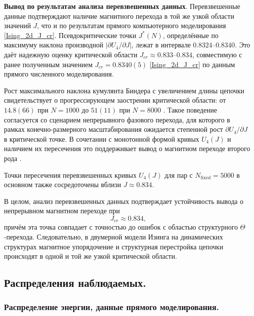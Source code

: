   
   \textbf{Вывод по результатам анализа перевзвешенных данных}. 
   Перевзвешенные данные подтверждают наличие магнитного перехода в той же узкой области значений $J$, что и по результатам прямого компьютерного моделирования \eqref{Ising_2d_J_cr}. 
   Псевдокритические точки $J^*(N)$, определённые по максимуму наклона производной  $|\partial U_4/\partial J|$, лежат в интервале $0.8324\text{--}0.8340$.
   Это даёт  надежную оценку критической области $J_{cr}\approx 0.833\text{--}0.834$, совместимую с ранее полученным значением $J_{cr}=0.8340(5)$ \eqref{Ising_2d_J_cr} по данным прямого численного моделирования.
   
   Рост максимального наклона кумулянта Биндера с увеличением длины цепочки
   свидетельствует о прогрессирующем заострении критической области: от $14.8(66)$ при $N=1000$ до $51(11)$ при $N=8000$ .
   Такое поведение согласуется со сценарием непрерывного фазового перехода,
   для которого в рамках конечно-размерного масштабирования ожидается степенной рост
   $\partial U_4/\partial J$ в критической точке.
    В сочетании с монотонной формой кривых
   $U_4(J)$ и наличием их пересечения это поддерживает вывод о магнитном переходе второго рода \cite{PhysRevLett.47.693}. 
   
 
     Точки пересечения перевзвешенных кривых $U_4(J)$ для пар с $N_{\mathrm{fixed}}=5000$ в основном также сосредоточены вблизи $J\approx 0.834$.  
     
     В целом, анализ перевзвешенных данных подтверждает устойчивость вывода о непрерывном магнитном переходе при
     \[
     J_{cr}\approx 0.834,
     \]
     причём эта точка совпадает с точностью до ошибок с областью структурного $\Theta$-перехода. 
     Следовательно, в двумерной модели Изинга на динамических структурах магнитное упорядочение и структурная перестройка цепочки происходят в одной и той же узкой критической области.
     
 
     
     
 \subsection{Распределения наблюдаемых.}
 
   \subsubsection{Распределение энергии, данные прямого моделирования.}  
   
